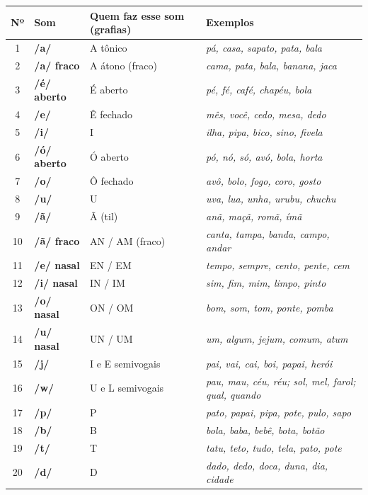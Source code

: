 \begin{center}
\begin{tabular}{@{}cp{2.6cm}p{5.2cm}p{5.2cm}@{}}
\hline
\textbf{Nº} & \textbf{Som} & \textbf{Quem faz esse som (grafias)} & \textbf{Exemplos} \\
\hline
1 & \textbf{/a/} & A tônico & \textit{pá, casa, sapato, pata, bala} \\
2 & \textbf{/a/ fraco} & A átono (fraco) & \textit{cama, pata, bala, banana, jaca} \\
3 & \textbf{/é/ aberto} & É aberto & \textit{pé, fé, café, chapéu, bola} \\
4 & \textbf{/e/} & Ê fechado & \textit{mês, você, cedo, mesa, dedo} \\
5 & \textbf{/i/} & I & \textit{ilha, pipa, bico, sino, fivela} \\
6 & \textbf{/ó/ aberto} & Ó aberto & \textit{pó, nó, só, avó, bola, horta} \\
7 & \textbf{/o/} & Ô fechado & \textit{avô, bolo, fogo, coro, gosto} \\
8 & \textbf{/u/} & U & \textit{uva, lua, unha, urubu, chuchu} \\
9 & \textbf{/ã/} & Ã (til) & \textit{anã, maçã, romã, ímã} \\
10 & \textbf{/ã/ fraco} & AN / AM (fraco) & \textit{canta, tampa, banda, campo, andar} \\
11 & \textbf{/e/ nasal} & EN / EM & \textit{tempo, sempre, cento, pente, cem} \\
12 & \textbf{/i/ nasal} & IN / IM & \textit{sim, fim, mim, limpo, pinto} \\
13 & \textbf{/o/ nasal} & ON / OM & \textit{bom, som, tom, ponte, pomba} \\
14 & \textbf{/u/ nasal} & UN / UM & \textit{um, algum, jejum, comum, atum} \\
15 & \textbf{/j/} & I e E semivogais & \textit{pai, vai, cai, boi, papai, herói} \\
16 & \textbf{/w/} & U e L semivogais & \textit{pau, mau, céu, réu; sol, mel, farol; qual, quando} \\
17 & \textbf{/p/} & P & \textit{pato, papai, pipa, pote, pulo, sapo} \\
18 & \textbf{/b/} & B & \textit{bola, baba, bebê, bota, botão} \\
19 & \textbf{/t/} & T & \textit{tatu, teto, tudo, tela, pato, pote} \\
20 & \textbf{/d/} & D & \textit{dado, dedo, doca, duna, dia, cidade} \\

\end{tabular}
\end{center}
